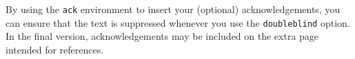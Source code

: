 \documentclass[doubleblind]{ecai}
\begin{document}
	
	\begin{ack}
		By using the \texttt{ack} environment to insert your (optional) 
		acknowledgements, you can ensure that the text is suppressed whenever 
		you use the \texttt{doubleblind} option. In the final version, 
		acknowledgements may be included on the extra page intended for references.
	\end{ack}
	
	
	
	
	
\end{document}

